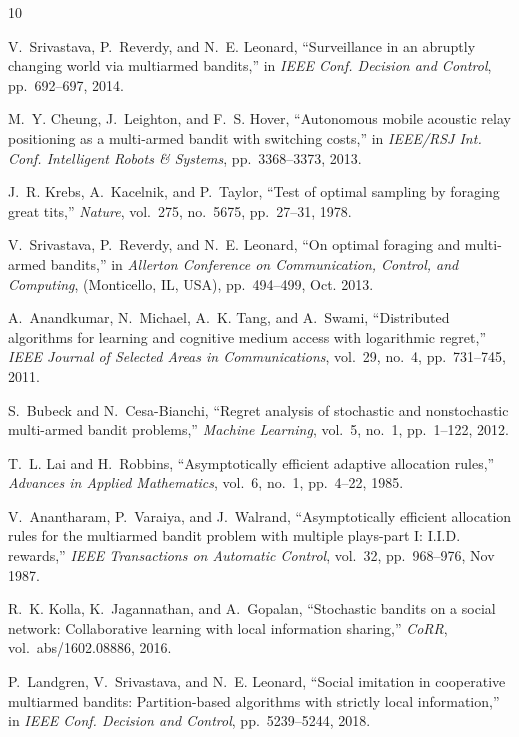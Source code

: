 \documentclass[final,5p,times,twocolumn]{elsarticle}
\theoremstyle{definition}
\begin{document}
\begin{thebibliography}{10}
	
	V.~Srivastava, P.~Reverdy, and N.~E. Leonard, ``Surveillance in an abruptly
	changing world via multiarmed bandits,'' in {\em IEEE Conf. Decision and
		Control}, pp.~692--697, 2014.
	
	M.~Y. Cheung, J.~Leighton, and F.~S. Hover, ``Autonomous mobile acoustic relay
	positioning as a multi-armed bandit with switching costs,'' in {\em IEEE/RSJ
		Int. Conf. Intelligent Robots \& Systems}, pp.~3368--3373, 2013.
	
	J.~R. Krebs, A.~Kacelnik, and P.~Taylor, ``Test of optimal sampling by foraging
	great tits,'' {\em Nature}, vol.~275, no.~5675, pp.~27--31, 1978.
	
	V.~Srivastava, P.~Reverdy, and N.~E. Leonard, ``On optimal foraging and
	multi-armed bandits,'' in {\em Allerton Conference on Communication, Control,
		and Computing}, (Monticello, IL, USA), pp.~494--499, Oct. 2013.
	
	A.~Anandkumar, N.~Michael, A.~K. Tang, and A.~Swami, ``Distributed algorithms
	for learning and cognitive medium access with logarithmic regret,'' {\em IEEE
		Journal of Selected Areas in Communications}, vol.~29, no.~4, pp.~731--745,
	2011.
	
	S.~Bubeck and N.~Cesa-Bianchi, ``Regret analysis of stochastic and
	nonstochastic multi-armed bandit problems,'' {\em Machine Learning}, vol.~5,
	no.~1, pp.~1--122, 2012.
	
	T.~L. Lai and H.~Robbins, ``Asymptotically efficient adaptive allocation
	rules,'' {\em Advances in Applied Mathematics}, vol.~6, no.~1, pp.~4--22,
	1985.
	
	V.~Anantharam, P.~Varaiya, and J.~Walrand, ``Asymptotically efficient
	allocation rules for the multiarmed bandit problem with multiple plays-part
	{I}: {I.I.D.} rewards,'' {\em IEEE Transactions on Automatic Control},
	vol.~32, pp.~968--976, Nov 1987.
	
	R.~K. Kolla, K.~Jagannathan, and A.~Gopalan, ``Stochastic bandits on a social
	network: Collaborative learning with local information sharing,'' {\em CoRR},
	vol.~abs/1602.08886, 2016.
	
	P.~Landgren, V.~Srivastava, and N.~E. Leonard, ``Social imitation in
	cooperative multiarmed bandits: Partition-based algorithms with strictly
	local information,'' in {\em IEEE Conf. Decision and Control},
	pp.~5239--5244, 2018.
	

\end{thebibliography}
\end{document}
